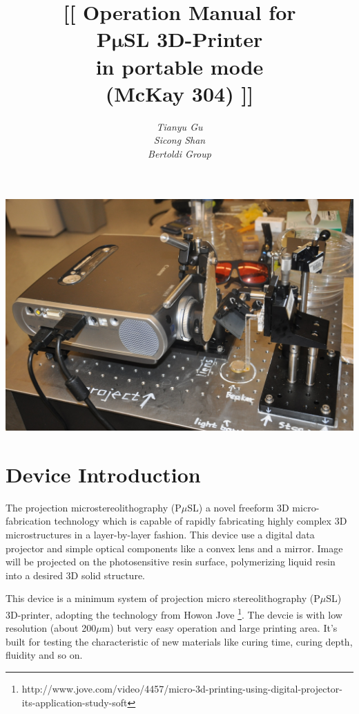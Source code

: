 \documentclass[a4paper]{article}
\title{\textbf{ [[
        \Large {Operation Manual for} \\ 
        \vspace {10pt}
        \Huge {P$\bm{\mu}$SL 3D-Printer } \\
        \vspace {10pt}
        \LARGE {in portable mode}    \\
        \vspace {10pt}
        \Large{(McKay 304)}
        \vspace {20pt}]]
}}
\author{\textit{Tianyu Gu} \\
    \textit{Sicong Shan} \\
\textit{Bertoldi Group}}
\begin{document}
\maketitle
\vspace{50pt}

\centering
\includegraphics[width=400pt]{frontpic.jpg}
\clearpage

\tableofcontents 
\clearpage

\raggedright

\section{Device Introduction}\label{sec:device-introduction}
The projection microstereolithography (P$\mu$SL) a novel freeform 3D micro-fabrication technology 
which is capable of rapidly fabricating highly complex 3D microstructures in a layer-by-layer fashion. 
This device use a digital data projector and simple optical components like a convex lens and a mirror. 
Image will be projected on the photosensitive resin surface, polymerizing liquid resin into a desired 
3D solid structure. \\ 
\vspace{10pt}

This device is a minimum system of projection micro stereolithography (P$\mu$SL) 3D-printer, adopting the
technology from Howon Jove \footnote{http://www.jove.com/video/4457/micro-3d-printing-using-digital-projector-its-application-study-soft}.
The devcie is with low resolution (about 200$\mu$m) but very easy operation and large printing area. 
It's built for testing the characteristic of new materials like curing time, curing depth, fluidity and so on. \\
\vspace{10pt}
\end{document}
